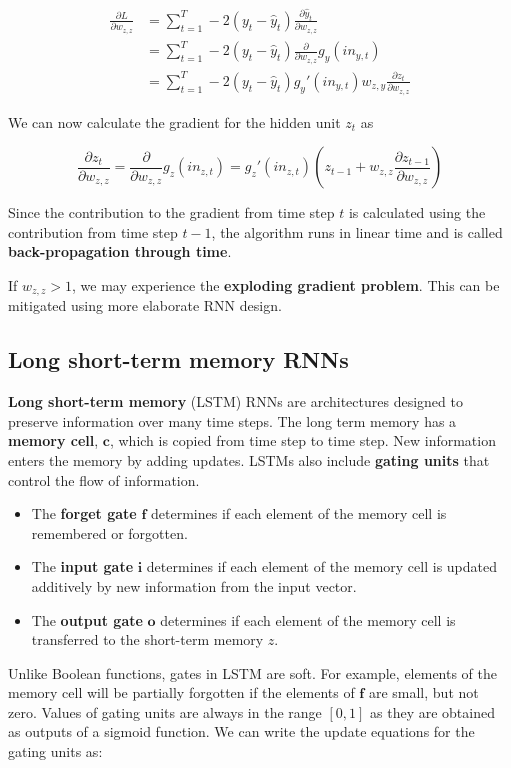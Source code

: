 \documentclass{article}
\renewcommand{\vec}[1]{\textbf{#1}}
\newcommand{\pdv}[2]{\frac{\partial{#1}}{\partial{#2}}}
\begin{document}
\begin{align*}
    \pdv{L}{w_{z,z}} &= \sum_{t=1}^T -2(y_t - \hat y_t) \pdv{\hat y_t}{w_{z,z}} \\
    &= \sum_{t=1}^T -2(y_t - \hat y_t) \pdv{}{w_{z,z}} g_y(in_{y,t}) \\
    &= \sum_{t=1}^T -2(y_t - \hat y_t)g_y'(in_{y,t}) w_{z,y} \pdv{z_t}{w_{z,z}}
\end{align*}

We can now calculate the gradient for the hidden unit $z_t$ as

\[
\pdv{z_t}{w_{z,z}} = \pdv{}{w_{z,z}} g_z(in_{z,t}) = g_z'(in_{z,t}) \left(z_{t-1} + w_{z,z} \pdv{z_{t-1}}{w_{z,z}} \right)
\]

Since the contribution to the gradient from time step $t$ is calculated using the
contribution from time step $t - 1$, the algorithm runs in linear time and is called 
\textbf{back-propagation through time}.

If $w_{z,z} > 1$, we may experience the \textbf{exploding gradient problem}. This can
be mitigated using more elaborate RNN design.

\subsection{Long short-term memory RNNs}

\textbf{Long short-term memory} (LSTM) RNNs are architectures designed to preserve
information over many time steps. The long term memory has a \textbf{memory cell},
$\vec{c}$, which is copied from time step to time step. New information enters the
memory by adding updates. LSTMs also include \textbf{gating units} that control
the flow of information.

\begin{itemize}
    \item The \textbf{forget gate} $\vec{f}$ determines if each element of the memory
    cell is remembered or forgotten.
    \item The \textbf{input gate} $\vec{i}$ determines if each element of the memory
    cell is updated additively by new information from the input vector.
    \item The \textbf{output gate} $\vec{o}$ determines if each element of the memory
    cell is transferred to the short-term memory $z$.
\end{itemize}

Unlike Boolean functions, gates in LSTM are soft. For example, elements of the memory
cell will be partially forgotten if the elements of $\vec{f}$ are small, but not zero.
Values of gating units are always in the range $[0, 1]$ as they are obtained as outputs
of a sigmoid function. We can write the update equations for the gating units as:
\end{document}
